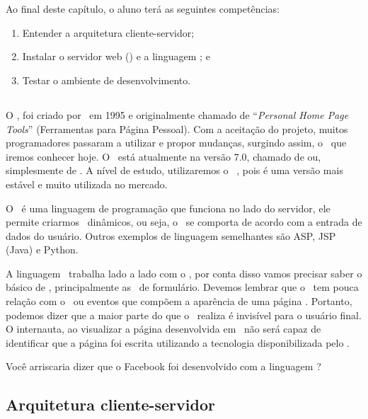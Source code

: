 \chapter{\php}

Ao final deste capítulo, o aluno terá as seguintes competências:
\begin{enumerate}
	\item Entender a arquitetura cliente-servidor;
	\item Instalar o servidor web (\apache) e a linguagem \php; e
	\item Testar o ambiente de desenvolvimento. 
\end{enumerate}

\section{\phpcompleto}

O \phpcompleto, foi criado por \phpcriador~em 1995 e originalmente chamado de 
“\textit{Personal Home Page Tools}” (Ferramentas para Página Pessoal). Com a 
aceitação do projeto, muitos programadores passaram a utilizar e propor mudanças,
surgindo assim, o \php~que iremos conhecer hoje. O \php~está atualmente na
versão 7.0, chamado de  ou, simplesmente de \php. A nível de estudo, 
utilizaremos o \php~\phpversao, pois é uma versão mais estável e muito 
utilizada no mercado.

O \php~é uma linguagem de programação que funciona no lado do servidor, 
ele permite criarmos \sites~dinâmicos, ou seja, o \site~se comporta de acordo 
com a entrada de dados do usuário. Outros exemplos de linguagem semelhantes são 
ASP, JSP (Java) e Python.

A linguagem \php~trabalha lado a lado com o \htmlcompleto, por conta disso vamos
precisar saber o básico de \html, principalmente as \tags~de formulário. Devemos
lembrar que o \php~tem pouca relação com o \layout~ou eventos que compõem a 
aparência de uma página \web. Portanto, podemos dizer que a maior parte do que o
\php~realiza é invisível para o usuário final. O internauta, ao visualizar a 
página desenvolvida em \php~não será capaz de identificar que a página foi 
escrita utilizando a tecnologia disponibilizada pelo \php. 

Você arriscaria dizer que o Facebook foi desenvolvido com a linguagem \php?

\section{Arquitetura cliente-servidor}
\label{arquitetura-cliente-servidor}

